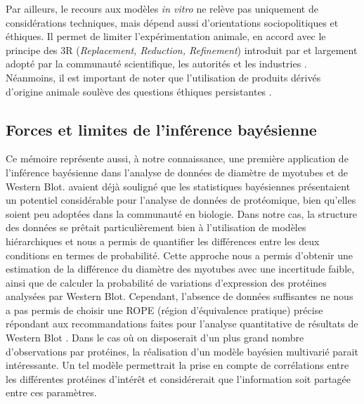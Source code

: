 \documentclass[11pt]{report}
\begin{document}
Par ailleurs, le recours aux modèles \textit{in vitro} ne relève pas uniquement de considérations techniques, mais dépend aussi d'orientations sociopolitiques et éthiques. Il permet de limiter l'expérimentation animale, en accord avec le principe des 3R (\textit{Replacement, Reduction, Refinement}) introduit par \textcite{Russell1959} et largement adopté par la communauté scientifique, les autorités et les industries \parencite{Rosolowski2025Nov}. Néanmoins, il est important de noter que l'utilisation de produits dérivés d'origine animale soulève des questions éthiques persistantes \parencite{Grimm2023Jun}.

\subsection{Forces et limites de l'inférence bayésienne}

\medskip Ce mémoire représente aussi, à notre connaissance, une première application de l'inférence bayésienne dans l'analyse de données de diamètre de myotubes et de Western Blot. \textcite{Crook2022Apr} avaient déjà souligné que les statistiques bayésiennes présentaient un potentiel considérable pour l'analyse de données de protéomique, bien qu'elles soient peu adoptées dans la communauté en biologie. Dans notre cas, la structure des données se prêtait particulièrement bien à l'utilisation de modèles hiérarchiques et nous a permis de quantifier les différences entre les deux conditions en termes de probabilité. Cette approche nous a permis d'obtenir une estimation de la différence du diamètre des myotubes avec une incertitude faible, ainsi que de calculer la probabilité de variations d'expression des protéines analysées par Western Blot. Cependant, l'absence de données suffisantes ne nous a pas permis de choisir une ROPE (région d'équivalence pratique) précise répondant aux recommandations faites pour l'analyse quantitative de résultats de Western Blot \parencite{BibEntry2026Apr}. Dans le cas où on disposerait d'un plus grand nombre d'observations par protéines, la réalisation d'un modèle bayésien multivarié parait intéressante. Un tel modèle permettrait la prise en compte de corrélations entre les différentes protéines d'intérêt et considérerait que l'information soit partagée entre ces paramètres. 
\end{document}
